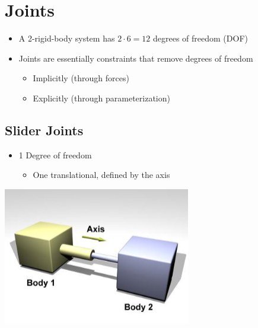 \documentclass{article}
\begin{document}
\section*{Joints}
\begin{itemize}
    \item A 2-rigid-body system has $2 \cdot 6 = 12$ degrees of freedom (DOF)
    \item Joints are essentially constraints that remove degrees of freedom
    \begin{itemize}
        \item Implicitly (through forces)
        \item Explicitly (through parameterization)
    \end{itemize}
\end{itemize}
\subsection*{Slider Joints}
\begin{itemize}
    \item 1 Degree of freedom
    \begin{itemize}
        \item One translational, defined by the axis
    \end{itemize}
\end{itemize}
\begin{center}
    \includegraphics*[scale=0.8]{W7_2.png}
\end{center}
\end{document}
